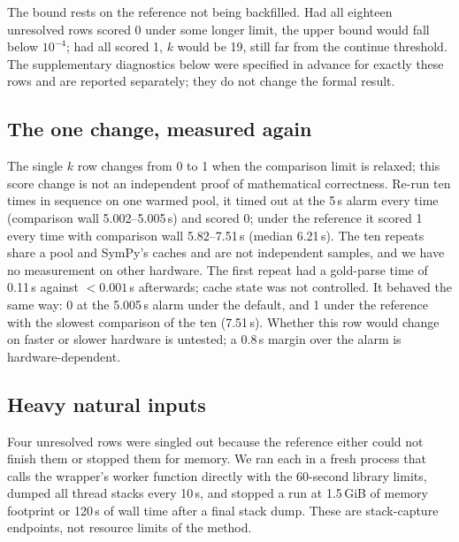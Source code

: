 \documentclass[11pt,a4paper]{article}
\begin{document}
The bound rests on the reference not being backfilled. Had all eighteen unresolved rows scored 0 under some longer limit, the upper bound would fall below $10^{-4}$; had all scored 1, $k$ would be 19, still far from the continue threshold. The supplementary diagnostics below were specified in advance for exactly these rows and are reported separately; they do not change the formal result.

\subsection{The one change, measured again}
The single $k$ row changes from 0 to 1 when the comparison limit is relaxed; this score change is not an independent proof of mathematical correctness. Re-run ten times in sequence on one warmed pool, it timed out at the 5\,s alarm every time (comparison wall 5.002--5.005\,s) and scored 0; under the reference it scored 1 every time with comparison wall 5.82--7.51\,s (median 6.21\,s). The ten repeats share a pool and SymPy's caches and are not independent samples, and we have no measurement on other hardware. The first repeat had a gold-parse time of 0.11\,s against $<0.001$\,s afterwards; cache state was not controlled. It behaved the same way: 0 at the 5.005\,s alarm under the default, and 1 under the reference with the slowest comparison of the ten (7.51\,s). Whether this row would change on faster or slower hardware is untested; a 0.8\,s margin over the alarm is hardware-dependent.

\subsection{Heavy natural inputs}\label{sec:heavyinputs}
Four unresolved rows were singled out because the reference either could not finish them or stopped them for memory. We ran each in a fresh process that calls the wrapper's worker function directly with the 60-second library limits, dumped all thread stacks every 10\,s, and stopped a run at 1.5\,GiB of memory footprint or 120\,s of wall time after a final stack dump. These are stack-capture endpoints, not resource limits of the method.
\end{document}
